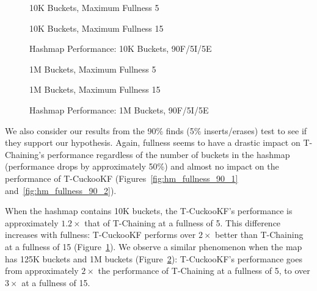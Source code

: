 \begin{figure}[H]
    \centering
    \begin{minipage}{0.75\textwidth}
    \caption*{10K Buckets, Maximum Fullness 5}
        \vspace{12pt}
    \end{minipage}
   \begin{minipage}{0.75\textwidth}
    \caption*{10K Buckets, Maximum Fullness 15}
        \vspace{12pt}
    \end{minipage}
	\caption{Hashmap Performance: 10K Buckets, 90F/5I/5E}
    \label{fig:hm_90_1}
\end{figure}

\begin{figure}[H]
    \centering
    \begin{minipage}{0.75\textwidth}
    \caption*{1M Buckets, Maximum Fullness 5}
        \vspace{12pt}
    \end{minipage}
   \begin{minipage}{0.75\textwidth}
    \caption*{1M Buckets, Maximum Fullness 15}
        \vspace{12pt}
    \end{minipage}
	\caption{Hashmap Performance: 1M Buckets, 90F/5I/5E}
    \label{fig:hm_90_3}
\end{figure}

We also consider our results from the 90\% finds (5\% inserts/erases) test to see if they support our hypothesis.
Again, fullness seems to have a drastic impact on T-Chaining's performance regardless of the number of buckets in the hashmap (performance drops by approximately 50\%) and almost no impact on the performance of T-CuckooKF (Figures~\ref{fig:hm_fullness_90_1} and~\ref{fig:hm_fullness_90_2}). 

When the hashmap contains 10K buckets, the T-CuckooKF's performance is approximately $1.2\times$ that of T-Chaining at a fullness of 5. This difference increases with fullness: T-CuckooKF performs over $2\times$ better than T-Chaining at a fullness of 15 (Figure~\ref{fig:hm_90_1}).
We observe a similar phenomenon when the map has 125K buckets and 1M buckets (Figure~\ref{fig:hm_90_3}): T-CuckooKF's performance goes from approximately $2\times$ the performance of T-Chaining at a fullness of 5, to over $3\times$ at a fullness of 15.
 
